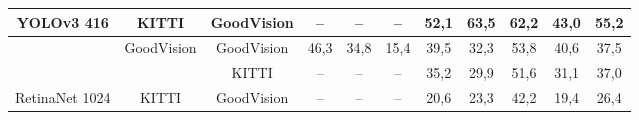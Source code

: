 \documentclass[twoside]{ctuthesis}
\theoremstyle{plain}
\theoremstyle{definition}
\theoremstyle{note}
\begin{document}
\begin{table}[hbt]
{\begin{tabular}{|c|c|c|c|c|c|c|c|c|c|c|}
\multirow{-3}{*}{YOLOv3 416}                             & \multirow{-2}{*}{KITTI}                                             & GoodVision                                                         & --                                                                     & --                                                                 & --                                                                        & 52,1                                                               & 63,5                                                                  & 62,2                                                                 & 43,0                                                               & 55,2                                                            \\ \hline
                                                         & GoodVision                                                          & GoodVision                                                         & 46,3                                                                   & 34,8                                                               & 15,4                                                                      & 39,5                                                               & 32,3                                                                  & 53,8                                                                 & 40,6                                                               & 37,5                                                            \\ \cline{2-11} 
                                                         &                                                                     & KITTI                                                              & --                                                                     & --                                                                 & --                                                                        & 35,2                                                               & 29,9                                                                  & 51,6                                                                 & 31,1                                                               & 37,0                                                            \\ \cline{3-11} 
\multirow{-3}{*}{RetinaNet 1024}                         & \multirow{-2}{*}{KITTI}                                             & GoodVision                                                         & --                                                                     & --                                                                 & --                                                                        & 20,6                                                               & 23,3                                                                  & 42,2                                                                 & 19,4                                                               & 26,4                                                            \\ \hline

\end{tabular}}
\end{table}
\end{document}
